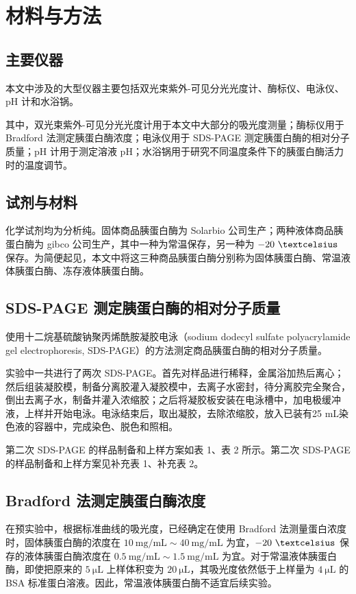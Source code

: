 \documentclass[11pt,UTF8]{ctexart}
\begin{document}
    

    \section{材料与方法}
    \subsection{主要仪器}
    本文中涉及的大型仪器主要包括双光束紫外-可见分光光度计、酶标仪、电泳仪、pH 计和水浴锅。

    其中，双光束紫外-可见分光光度计用于本文中大部分的吸光度测量；酶标仪用于 Bradford 法测定胰蛋白酶浓度；电泳仪用于 SDS-PAGE 测定胰蛋白酶的相对分子质量；pH 计用于测定溶液 pH；水浴锅用于研究不同温度条件下的胰蛋白酶活力时的温度调节。

    \subsection{试剂与材料}
    化学试剂均为分析纯。固体商品胰蛋白酶为 Solarbio 公司生产；两种液体商品胰蛋白酶为 gibco 公司生产，其中一种为常温保存，另一种为 \(-20\ \textcelsius\) 保存。为简便起见，本文中将这三种商品胰蛋白酶分别称为固体胰蛋白酶、常温液体胰蛋白酶、冻存液体胰蛋白酶。

    \subsection{SDS-PAGE 测定胰蛋白酶的相对分子质量}
    使用十二烷基硫酸钠聚丙烯酰胺凝胶电泳（sodium dodecyl sulfate polyacrylamide gel electrophoresis, SDS-PAGE）的方法测定商品胰蛋白酶的相对分子质量。
    
    实验中一共进行了两次 SDS-PAGE。首先对样品进行稀释，金属浴加热后离心；然后组装凝胶模，制备分离胶灌入凝胶模中，去离子水密封，待分离胶完全聚合，倒出去离子水，制备并灌入浓缩胶；之后将凝胶板安装在电泳槽中，加电极缓冲液，上样并开始电泳。电泳结束后，取出凝胶，去除浓缩胶，放入已装有25 mL染色液的容器中，完成染色、脱色和照相。

    第二次 SDS-PAGE 的样品制备和上样方案如表 1、表 2 所示。第二次 SDS-PAGE 的样品制备和上样方案见补充表 1、补充表 2。

    \subsection{Bradford 法测定胰蛋白酶浓度}
    在预实验中，根据标准曲线的吸光度，已经确定在使用 Bradford 法测量蛋白浓度时，固体胰蛋白酶的浓度在 \(10\ \mathrm{mg/mL} \sim 40\ \mathrm{mg/mL}\) 为宜，\(-20\ \textcelsius\) 保存的液体胰蛋白酶浓度在 \(0.5\ \mathrm{mg/mL} \sim 1.5\ \mathrm{mg/mL}\) 为宜。对于常温液体胰蛋白酶，即使把原来的 \(\mathrm{5\ \mu L}\) 上样体积变为 \(\mathrm{20\ \mu L}\)，其吸光度依然低于上样量为 \(\mathrm{4\ \mu L}\) 的 BSA 标准蛋白溶液。因此，常温液体胰蛋白酶不适宜后续实验。
\end{document}
